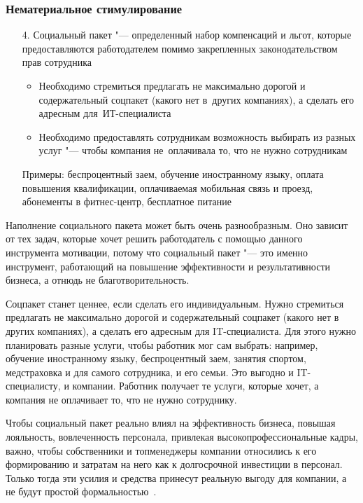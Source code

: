 \documentclass{../industrial-development}
\begin{document}
\begin{frame} \frametitle{Нематериальное стимулирование}
				  \begin{itemize}
						\item[4.] \alert{Социальный пакет} "--- определенный набор компенсаций и льгот, которые предоставляются работодателем помимо закрепленных законодательством прав сотрудника
						  \begin{itemize}
							\item Необходимо стремиться предлагать не максимально дорогой и содержательный соцпакет (какого нет в~других компаниях), а сделать его адресным для~ИТ-специалиста
							\item Необходимо предоставлять сотрудникам возможность выбирать из разных услуг "--- чтобы компания не~оплачивала то, что не нужно сотрудникам
							  \end{itemize}
						Примеры: беспроцентный заем, обучение иностранному языку, оплата повышения квалификации, оплачиваемая мобильная связь и проезд, абонементы в фитнес-центр, бесплатное питание
  \end{itemize}
		\end{frame}
		
		\lecturenotes
		
Наполнение социального пакета может быть очень разнообразным. Оно зависит от тех задач, которые хочет решить работодатель с помощью данного инструмента мотивации, потому что социальный пакет "--- это именно инструмент, работающий на повышение эффективности и результативности бизнеса, а отнюдь не благотворительность.
		
Соцпакет станет ценнее, если сделать его индивидуальным. Нужно стремиться предлагать не максимально дорогой и содержательный соцпакет (какого нет в других компаниях), а сделать его адресным для IT-специалиста. Для этого нужно планировать разные услуги, чтобы работник мог сам выбрать: например, обучение иностранному языку, беспроцентный заем, занятия спортом, медстраховка и для самого сотрудника, и его семьи. Это выгодно и IT-специалисту, и компании. Работник получает те услуги, которые хочет, а компания не оплачивает то, что не нужно сотруднику.

Чтобы социальный пакет реально влиял на эффективность бизнеса, повышая лояльность, вовлеченность персонала, привлекая высокопрофессиональные кадры, важно, чтобы собственники и топ­менеджеры компании относились к его формированию и затратам на него как к долгосрочной инвестиции в персонал. Только тогда эти усилия и средства принесут реальную выгоду для компании, а не будут простой формальностью~\cite{VchemosobenIT}.
\end{document}

